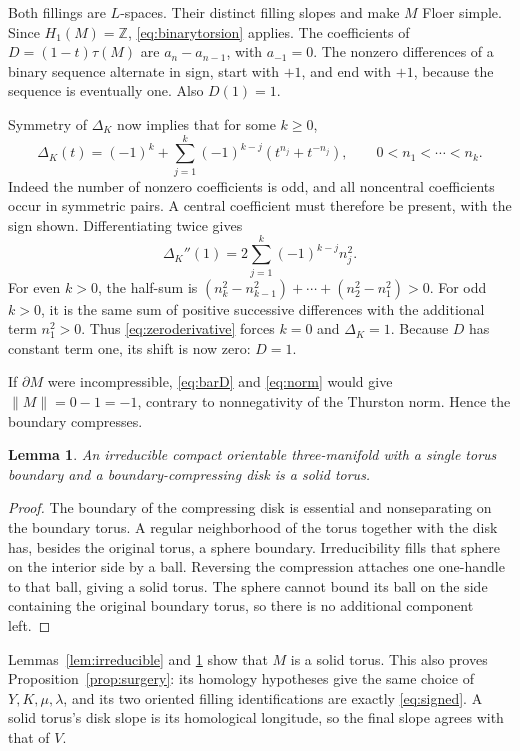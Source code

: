 \documentclass[11pt]{amsart}
\newtheorem{lemma}[theorem]{Lemma}
\theoremstyle{definition}
\theoremstyle{remark}
\newcommand{\Z}{\mathbb Z}
\newcommand{\bd}{\partial}
\begin{document}
Both fillings are \(L\)-spaces. Their distinct filling slopes
and \cite[Proposition~1.3]{RR} make \(M\)
Floer simple. Since \(H_1(M)=\Z\),
\eqref{eq:binarytorsion} applies. The
coefficients of \(D=(1-t)\tau(M)\) are
\(a_n-a_{n-1}\), with \(a_{-1}=0\).
The nonzero differences of a binary sequence
alternate in sign, start with \(+1\), and
end with \(+1\), because the sequence is
eventually one. Also \(D(1)=1\).

Symmetry of \(\Delta_K\) now implies that
for some \(k\ge0\),
\begin{equation}\label{eq:alternating}
 \Delta_K(t)=(-1)^k+
   \sum_{j=1}^k(-1)^{k-j}(t^{n_j}+t^{-n_j}),
 \qquad 0<n_1<\cdots<n_k .
\end{equation}
Indeed the number of nonzero coefficients
is odd, and all noncentral coefficients
occur in symmetric pairs. A central
coefficient must therefore be present,
with the sign shown.
Differentiating twice gives
\begin{equation}\label{eq:positive}
 \Delta_K''(1)=
 2\sum_{j=1}^k(-1)^{k-j}n_j^2.
\end{equation}
For even \(k>0\), the half-sum is
\((n_k^2-n_{k-1}^2)+\cdots+(n_2^2-n_1^2)>0\).
For odd \(k>0\), it is the same sum of
positive successive differences with
the additional term \(n_1^2>0\).
Thus \eqref{eq:zeroderivative} forces \(k=0\)
and \(\Delta_K=1\).
Because \(D\) has constant term one,
its shift is now zero: \(D=1\).

If \(\bd M\) were incompressible,
\eqref{eq:barD} and \eqref{eq:norm} would give
\(\|M\|=0-1=-1\), contrary to nonnegativity
of the Thurston norm. Hence the boundary
compresses.

\begin{lemma}\label{lem:compress}
An irreducible compact orientable
three-manifold with a single torus boundary
and a boundary-compressing disk is a solid torus.
\end{lemma}
\begin{proof}
The boundary of the compressing disk is
essential and nonseparating on the boundary
torus. A regular neighborhood of the
torus together with the disk has, besides
the original torus, a sphere boundary.
Irreducibility fills that sphere on the
interior side by a ball. Reversing the
compression attaches one one-handle to
that ball, giving a solid torus. The sphere
cannot bound its ball on the side
containing the original boundary torus,
so there is no additional component left.
\end{proof}

Lemmas~\ref{lem:irreducible} and
\ref{lem:compress} show that \(M\) is a
solid torus. This also proves
Proposition~\ref{prop:surgery}: its
homology hypotheses give the same choice
of \(Y,K,\mu,\lambda\), and its two
oriented filling identifications are
exactly \eqref{eq:signed}. A solid torus's
disk slope is its homological longitude,
so the final slope agrees with that of \(V\).
\end{document}
